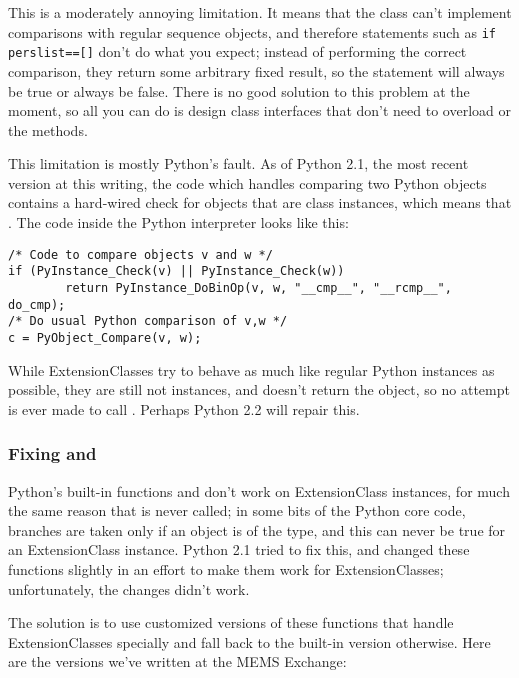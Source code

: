 This is a moderately annoying limitation.  It means that the
 class can't implement comparisons with regular
sequence objects, and therefore statements such as 
\verb|if perslist==[]| don't do what you expect; instead of performing the correct
comparison, they return some arbitrary fixed result, so the 
statement will always be true or always be false.  There is no good
solution to this problem at the moment, so all you can do is design
class interfaces that don't need to overload
 or the  methods.

This limitation is mostly Python's fault.  As of Python 2.1, the most
recent version at this writing, the code which handles comparing two
Python objects contains a hard-wired check for objects that are class
instances, which means that .
The code inside the Python interpreter looks like this:

\begin{verbatim}
/* Code to compare objects v and w */
if (PyInstance_Check(v) || PyInstance_Check(w))
        return PyInstance_DoBinOp(v, w, "__cmp__", "__rcmp__", do_cmp);
/* Do usual Python comparison of v,w */
c = PyObject_Compare(v, w);
\end{verbatim}

While ExtensionClasses try to behave as much like regular Python
instances as possible, they are still not instances, and
 doesn't return the  object, so 
no attempt is ever made to call .  Perhaps Python 2.2
will repair this.

\subsubsection{Fixing  and }

Python's built-in functions 
 and  don't
work on ExtensionClass instances, for much the same reason that 
 is never called; in some bits of the Python core code,
branches are taken only if an object is of the 
type, and this can never be true for an ExtensionClass instance.
Python 2.1 tried to fix this, and changed these functions slightly in
an effort to make them work for ExtensionClasses; unfortunately, the
changes didn't work.

The solution is to use customized versions of these functions that
handle ExtensionClasses specially and fall back to the built-in
version otherwise.  Here are the versions we've written at the MEMS Exchange:

